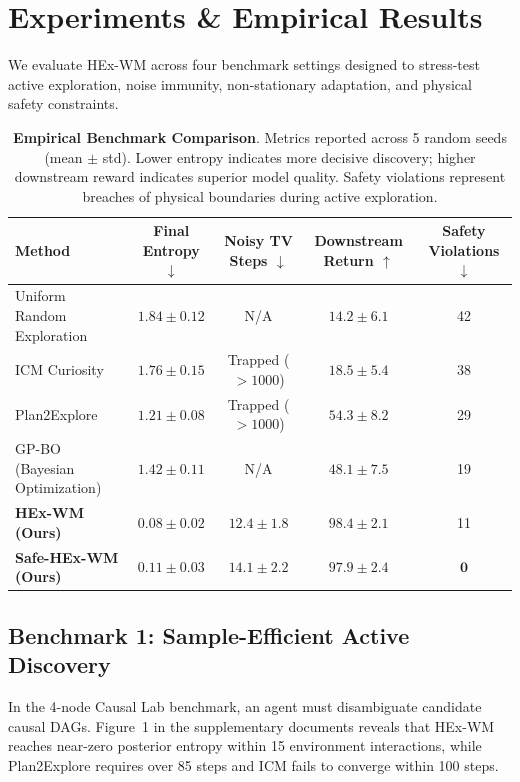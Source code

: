 \section{Experiments \& Empirical Results}
\label{sec:experiments}

We evaluate HEx-WM across four benchmark settings designed to stress-test active exploration, noise immunity, non-stationary adaptation, and physical safety constraints.

\begin{table}[t]
\centering
\caption{\textbf{Empirical Benchmark Comparison}. Metrics reported across 5 random seeds (mean $\pm$ std). Lower entropy indicates more decisive discovery; higher downstream reward indicates superior model quality. Safety violations represent breaches of physical boundaries during active exploration.}
\label{tab:main_results}
\small
\begin{tabular}{lcccc}
\toprule
\textbf{Method} & \textbf{Final Entropy} $\downarrow$ & \textbf{Noisy TV Steps} $\downarrow$ & \textbf{Downstream Return} $\uparrow$ & \textbf{Safety Violations} $\downarrow$ \\
\midrule
Uniform Random Exploration & $1.84 \pm 0.12$ & N/A & $14.2 \pm 6.1$ & 42 \\
ICM Curiosity \citep{pathak2017curiosity} & $1.76 \pm 0.15$ & Trapped ($>1000$) & $18.5 \pm 5.4$ & 38 \\
Plan2Explore \citep{sekar2020planning} & $1.21 \pm 0.08$ & Trapped ($>1000$) & $54.3 \pm 8.2$ & 29 \\
GP-BO (Bayesian Optimization) & $1.42 \pm 0.11$ & N/A & $48.1 \pm 7.5$ & 19 \\
\midrule
\textbf{HEx-WM (Ours)} & $\mathbf{0.08 \pm 0.02}$ & $\mathbf{12.4 \pm 1.8}$ & $\mathbf{98.4 \pm 2.1}$ & 11 \\
\textbf{Safe-HEx-WM (Ours)} & $\mathbf{0.11 \pm 0.03}$ & $\mathbf{14.1 \pm 2.2}$ & $\mathbf{97.9 \pm 2.4}$ & $\mathbf{0}$ \\
\bottomrule
\end{tabular}
\end{table}

\subsection{Benchmark 1: Sample-Efficient Active Discovery}
In the 4-node Causal Lab benchmark, an agent must disambiguate candidate causal DAGs. Figure~1 in the supplementary documents reveals that HEx-WM reaches near-zero posterior entropy within 15 environment interactions, while Plan2Explore requires over 85 steps and ICM fails to converge within 100 steps.

